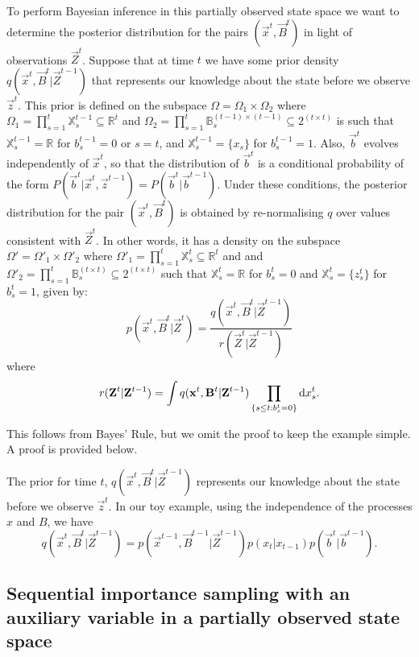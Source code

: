To perform Bayesian inference in this partially observed state space we want to determine the posterior distribution for the pairs $(\vec{x}^{t}, \vec{B}^{t})$ in light of observations $\vec{Z}^{t}$. Suppose that at time $t$ we have some prior density $q(\vec{x}^{t},\vec{B}^{t} | \vec{Z}^{t-1})$ that represents our knowledge about the state before we observe $\vec{z}^{t}$. This prior is defined on the subspace $\Omega = \Omega_1 \times \Omega_2$ where $\Omega_1 = \prod_{s=1}^t \mathbb{X}_s^{t-1} \subseteq \mathbb{R}^t$ and $\Omega_2 = \prod_{s=1}^t \mathbb{B}_s^{(t-1) \times (t-1)} \subseteq 2^{(t \times t)}$ is such that $\mathbb{X}_s^{t-1} = \mathbb{R}$ for $b_s^{t-1} = 0$ or $s=t$, and $\mathbb{X}_s^{t-1} = \{ x_s \}$ for $b_s^{t-1} = 1$. Also, $\vec{b}^{t}$ evolves independently of $\vec{x}^{t}$, so that the distribution of $\vec{b}^{t}$ is a conditional probability of the form $P(\vec{b}^{t} | \vec{x}^{t}, \vec{z}^{t-1} ) = P( \vec{b}^{t} | \vec{b}^{t-1} )$. Under these conditions, the posterior distribution for the pair $(\vec{x}^{t}, \vec{B}^{t})$ is obtained by re-normalising $q$ over values consistent with $\vec{Z}^{t}$. In other words, it has a density on the subspace $\Omega' = \Omega'_1 \times \Omega'_2$ where $\Omega'_1 = \prod_{s=1}^t \mathbb{X}_s^{t} \subseteq \mathbb{R}^t$ and and $\Omega'_2 = \prod_{s=1}^t \mathbb{B}_s^{(t \times t)} \subseteq 2^{(t \times t)}$ such that $\mathbb{X}_s^{t} = \mathbb{R}$ for $b_s^{t} = 0$ and $\mathbb{X}_s^{t} = \{ z_s^{t}\}$ for $b_s^{t} = 1$, given by:
\[
p(\vec{x}^{t}, \vec{B}^{t} | \vec{Z}^{t})  =   
\frac{ q(\vec{x}^{t}, \vec{B}^{t}|\vec{Z}^{t-1})} {r(\vec{Z}^{t} | \vec{Z}^{t-1})}
\]
where 
\[
r(\mathbf{Z}^{t} | \mathbf{Z}^{t-1}) = \int q(\mathbf{x}^{t}, \mathbf{B}^{t}|\mathbf{Z}^{t-1}) \prod_{\{s \leq t: b_s^{t} = 0\}} \mathrm{d} x_s^{t}.
\]

This follows from Bayes' Rule, but we omit the proof to keep the example simple. A proof is provided below.

The prior for time $t$, $q(\vec{x}^{t},\vec{B}^{t} | \vec{Z}^{t-1})$ represents our knowledge about the state before we observe $\vec{z}^{t}$. In our toy example, using the independence of the processes $x$ and $B$, we have
\begin{equation}
    q(\vec{x}^{t},\vec{B}^{t} | \vec{Z}^{t-1}) = p(\vec{x}^{t-1},\vec{B}^{t-1} | \vec{Z}^{t-1}) p(x_t | x_{t-1}) p(\vec{b}^{t} | \vec{b}^{t-1}).
    \label{eq:1}
\end{equation}

\subsection{Sequential importance sampling with an auxiliary variable in a partially observed state space}

